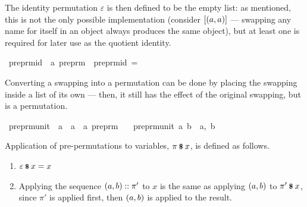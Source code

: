 The identity permutation \(\varepsilon\) is then defined to be the empty list: as mentioned, this is not the only possible implementation (consider \([\left(a, a\right)]\) --- swapping any name for itself in an object always produces the same object), but at least one is required for later use as the quotient identity.

\begin{implementation}
\isamarkupfalse%
\ preprm{\isacharunderscore}id\ {\isacharcolon}{\isacharcolon}\ {\isachardoublequoteopen}{\isacharprime}a\ preprm{\isachardoublequoteclose}\ \ {\isachardoublequoteopen}preprm{\isacharunderscore}id\ =\ {\isacharbrackleft}{\isacharbrackright}{\isachardoublequoteclose}\isanewline
\end{implementation}

Converting a swapping into a permutation can be done by placing the swapping inside a list of its own --- then, it still has the effect of the original swapping, but is a permutation.

\begin{implementation}
\isamarkupfalse%
\ preprm{\isacharunderscore}unit\ {\isacharcolon}{\isacharcolon}\ {\isachardoublequoteopen}{\isacharprime}a\ {\isasymRightarrow}\ {\isacharprime}a\ {\isasymRightarrow}\ {\isacharprime}a\ preprm{\isachardoublequoteclose}\ \isanewline
\ \ {\isachardoublequoteopen}preprm{\isacharunderscore}unit\ a\ b\ {\isasymequiv}\ {\isacharbrackleft}{\isacharparenleft}a,\ b{\isacharparenright}{\isacharbrackright}{\isachardoublequoteclose}\isanewline
\end{implementation}

\begin{definition}
Application of pre-permutations to variables, \(\pi \mathbin{\textrm{\footnotesize{\textbf{\$}}}} x\), is defined as follows.
\begin{enumerate}
\item
\(\varepsilon \mathbin{\textrm{\footnotesize{\textbf{\$}}}} x = x\)
\item
Applying the sequence \(\left(a, b\right) :: \pi'\) to \(x\) is the same as applying \(\left(a, b\right)\) to \(\pi' \mathbin{\textrm{\footnotesize{\textbf{\$}}}} x\), since \(\pi'\) is applied first, then \(\left(a, b\right)\) is applied to the result.
\end{enumerate}
\end{definition}

